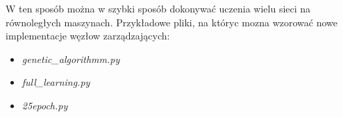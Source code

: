 W ten sposób można w szybki sposób dokonywać uczenia wielu sieci na równoległych maszynach.
Przykładowe pliki, na któryc mozna wzorować nowe implementacje węzłow zarządzających:

\begin{itemize}
  \item \textit{genetic\_algorithmm.py}
  \item \textit{full\_learning.py}
  \item \textit{25epoch.py}
\end{itemize}
